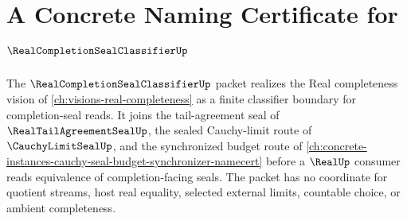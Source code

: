 \chapter{A Concrete Naming Certificate for $\RealCompletionSealClassifierUp$}
\label{ch:concrete-instances-real-completion-seal-classifier-namecert}

The $\RealCompletionSealClassifierUp$ packet realizes the Real completeness vision of \autoref{ch:visions-real-completeness} as a finite classifier boundary for completion-seal reads. It joins the tail-agreement seal of $\RealTailAgreementSealUp$, the sealed Cauchy-limit route of $\CauchyLimitSealUp$, and the synchronized budget route of \autoref{ch:concrete-instances-cauchy-seal-budget-synchronizer-namecert} before a $\RealUp$ consumer reads equivalence of completion-facing seals. The packet has no coordinate for quotient streams, host real equality, selected external limits, countable choice, or ambient completeness.

